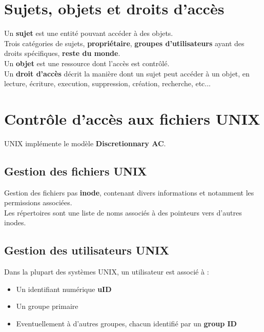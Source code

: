 \documentclass{report}
\begin{document}
	\section{Sujets, objets et droits d'accès}

		Un \textbf{sujet} est une entité pouvant accéder à des objets.\\
		Trois catégories de sujets, \textbf{propriétaire}, \textbf{groupes d'utilisateurs} ayant des droits spécifiques, \textbf{reste du monde}.\\

		Un \textbf{objet} est une ressource dont l'accès est contrôlé.\\

		Un \textbf{droit d'accès} décrit la manière dont un sujet peut accéder à un objet, en lecture, écriture, execution, suppression, création, recherche, etc...\\

	\section{Contrôle d'accès aux fichiers UNIX}

		UNIX implémente le modèle \textbf{Discretionnary AC}.\\

		\subsection{Gestion des fichiers UNIX}

			Gestion des fichiers pas \textbf{inode}, contenant divers informations et notamment les permissions associées.\\

			Les répertoires sont une liste de noms associés à des pointeurs vers d'autres inodes.\\

		\subsection{Gestion des utilisateurs UNIX}

			Dans la plupart des systèmes UNIX, un utilisateur est associé à : \\

			\begin{itemize}
				\item Un identifiant numérique \textbf{uID}
				\item Un groupe primaire 
				\item Eventuellement à d'autres groupes, chacun identifié par un \textbf{group ID}\\
			\end{itemize}
\end{document}
